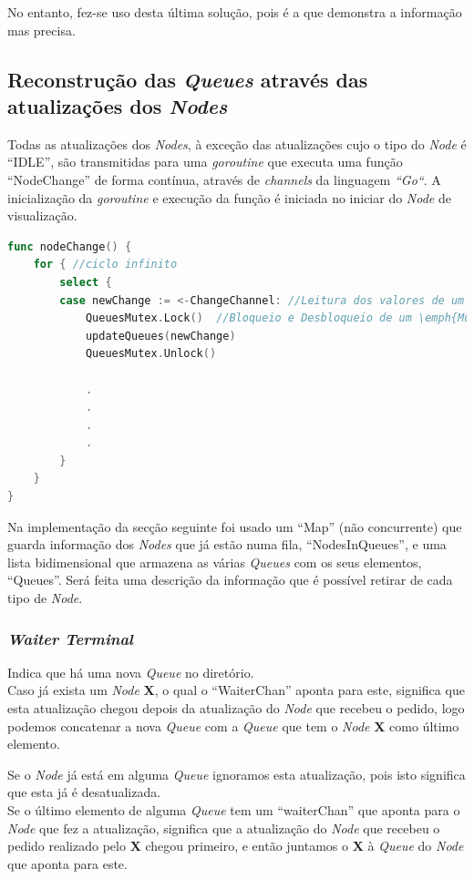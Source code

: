 No entanto, fez-se uso desta última solução, pois é a que demonstra a informação mas precisa.


\subsection*{Reconstrução das \emph{Queues} através das atualizações dos \emph{Nodes}}

Todas as atualizações dos \emph{Nodes}, à exceção das atualizações cujo o tipo do \emph{Node} é ``IDLE'', são transmitidas para uma \emph{goroutine} que executa uma função ``NodeChange'' de forma contínua, através de \emph{channels} da linguagem \emph{``Go``}. A inicialização da \emph{goroutine} e execução da função é iniciada no iniciar do \emph{Node} de visualização.
\begin{lstlisting}[caption={Função ``NodeChange'' executada por uma ``goroutine'' e recebe as atualizações através de um \emph{Channel}},language=Go]
func nodeChange() {
	for { //ciclo infinito
		select {
		case newChange := <-ChangeChannel: //Leitura dos valores de um \emph{channel}
			QueuesMutex.Lock()  //Bloqueio e Desbloqueio de um \emph{Mutex} para a escrita
			updateQueues(newChange)  
			QueuesMutex.Unlock()

		    .
		    .
		    .
		    .
		}
	}
}


\end{lstlisting}

Na implementação da secção seguinte foi usado um ``Map'' (não concurrente) que guarda informação dos \emph{Nodes} que já estão numa fila, ``NodesInQueues'', e uma lista bidimensional que armazena as várias \emph{Queues} com os seus elementos, ``Queues''.
Será feita uma descrição da informação que é possível retirar de cada tipo de \emph{Node}.


\subsubsection*{\emph{Waiter Terminal}}
Indica que há uma nova \emph{Queue} no diretório. \\

Caso já exista um \emph{Node} \textbf{X},
o qual o ``WaiterChan'' aponta para este, significa que esta atualização chegou depois da atualização do \emph{Node} que recebeu o pedido,
logo podemos concatenar a nova \emph{Queue} com a \emph{Queue} que tem o \emph{Node} \textbf{X} como último elemento.

Se o \emph{Node} já está em alguma \emph{Queue} ignoramos esta atualização, pois isto significa que esta já é desatualizada.\\
Se o último elemento de alguma \emph{Queue} tem um ``waiterChan'' que aponta para o \emph{Node} que fez a atualização, significa que a atualização do \emph{Node} que recebeu o pedido realizado pelo \textbf{X} chegou primeiro, e então juntamos o \textbf{X} à \emph{Queue} do \emph{Node} que aponta para este.\\

